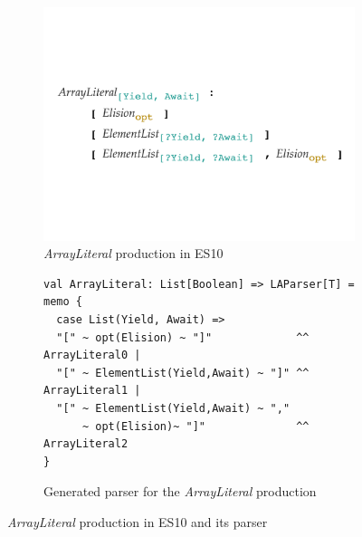 \begin{figure}
  \centering
  \begin{subfigure}[t]{0.4\textwidth}
    \includegraphics[width=\textwidth]{img/arrayliteral-syntax.pdf}
    \caption{\textit{ArrayLiteral} production in ES10}
    \label{fig:array-literal-es}
  \end{subfigure}
  \begin{subfigure}[t]{0.48\textwidth}
    \begin{lstlisting}[style=myScalastyle]
val ArrayLiteral: List[Boolean] => LAParser[T] = memo {
  case List(Yield, Await) =>
  "[" ~ opt(Elision) ~ "]"             ^^ ArrayLiteral0 |
  "[" ~ ElementList(Yield,Await) ~ "]" ^^ ArrayLiteral1 |
  "[" ~ ElementList(Yield,Await) ~ ","
      ~ opt(Elision)~ "]"              ^^ ArrayLiteral2
}
    \end{lstlisting}
    \vspace*{-1em}
    \caption{Generated parser for the \textit{ArrayLiteral} production}
    \label{fig:array-literal-parser}
  \end{subfigure}
  \vspace*{-1em}
  \caption{\textit{ArrayLiteral} production in ES10 and its parser}
  \label{fig:array-literal}
\end{figure}

\smallskip

